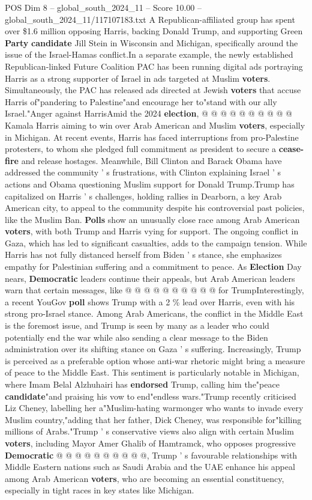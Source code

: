 \begin{textsample}{POS Dim 8 – global\_south\_2024\_11 – Score 10.00 – global\_south\_2024\_11/117107183.txt}
A Republican-affiliated group has spent over \$1.6 million opposing Harris, backing Donald Trump, and supporting Green \textbf{Party} \textbf{candidate} Jill Stein in Wisconsin and Michigan, specifically around the issue of the Israel-Hamas conflict.In a separate example, the newly established Republican-linked Future Coalition PAC has been running digital ads portraying Harris as a strong supporter of Israel in ads targeted at Muslim \textbf{voters}.
Simultaneously, the PAC has released ads directed at Jewish \textbf{voters} that accuse Harris of"pandering to Palestine"and encourage her to"stand with our ally Israel."Anger against HarrisAmid the 2024 \textbf{election}, @ @ @ @ @ @ @ @ @ @ Kamala Harris aiming to win over Arab American and Muslim \textbf{voters}, especially in Michigan.
At recent events, Harris has faced interruptions from pro-Palestine protesters, to whom she pledged full commitment as president to secure a \textbf{cease-fire} and release hostages.
Meanwhile, Bill Clinton and Barack Obama have addressed the community ' s frustrations, with Clinton explaining Israel ' s actions and Obama questioning Muslim support for Donald Trump.Trump has capitalized on Harris ' s challenges, holding rallies in Dearborn, a key Arab American city, to appeal to the community despite his controversial past policies, like the Muslim Ban. \textbf{Polls} show an unusually close race among Arab American \textbf{voters}, with both Trump and Harris vying for support.
The ongoing conflict in Gaza, which has led to significant casualties, adds to the campaign tension.
While Harris has not fully distanced herself from Biden ' s stance, she emphasizes empathy for Palestinian suffering and a commitment to peace.
As \textbf{Election} Day nears, \textbf{Democratic} leaders continue their appeals, but Arab American leaders warn that certain messages, like @ @ @ @ @ @ @ @ @ @ for TrumpInterestingly, a recent YouGov \textbf{poll} shows Trump with a 2 \% lead over Harris, even with his strong pro-Israel stance.
Among Arab Americans, the conflict in the Middle East is the foremost issue, and Trump is seen by many as a leader who could potentially end the war while also sending a clear message to the Biden administration over its shifting stance on Gaza ' s suffering.
Increasingly, Trump is perceived as a preferable option whose anti-war rhetoric might bring a measure of peace to the Middle East.
This sentiment is particularly notable in Michigan, where Imam Belal Alzhuhairi has \textbf{endorsed} Trump, calling him the"peace \textbf{candidate}"and praising his vow to end"endless wars."Trump recently criticised Liz Cheney, labelling her a"Muslim-hating warmonger who wants to invade every Muslim country,"adding that her father, Dick Cheney, was responsible for"killing millions of Arabs."Trump ' s conservative views also align with certain Muslim \textbf{voters}, including Mayor Amer Ghalib of Hamtramck, who opposes progressive \textbf{Democratic} @ @ @ @ @ @ @ @ @ @, Trump ' s favourable relationships with Middle Eastern nations such as Saudi Arabia and the UAE enhance his appeal among Arab American \textbf{voters}, who are becoming an essential constituency, especially in tight races in key states like Michigan.

\end{textsample}
